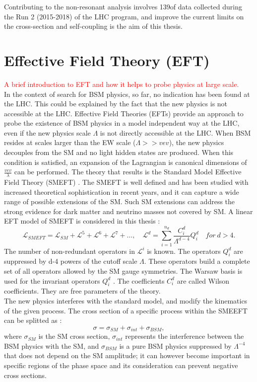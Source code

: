 Contributing to the \HHyybb non-resonant analysis involves 139\ifb of data collected during the Run 2 (2015-2018) of the LHC program, and improve the current limits on the cross-section and self-coupling is the aim of this thesis. 
\section{Effective Field Theory (EFT)}
\label{chap1:EFT}
\textcolor{red}{A brief introduction to EFT and how it helps to probe physics at large scale.\\}
In the context of search for BSM physics, so far, no indication has been found at the LHC. This could be explained by the fact that the new physics is not accessible at the LHC. Effective Field Theories (EFTs) provide an approach to probe the existence of BSM physics in a model independent way at the LHC, even if the new physics scale $\Lambda$ is not directly accessible at the LHC. When BSM resides at scales larger than the EW scale ($\Lambda >> vev$), the new physics decouples from the SM and no light hidden states are produced. When this condition is satisfied, an expansion of the Lagrangian is canonical dimensions of $\frac{vev}{\lambda}$ can be performed. The theory that results is the Standard Model Effective Field Theory (SMEFT) \cite{SMEFT_EFT}. The SMEFT is well defined and has been studied with increased theoretical sophistication in recent years, and it can capture a wide range of possible extensions of the SM. Such SM extensions can address the strong evidence for dark matter and neutrino masses not covered by SM. A linear EFT model of SMEFT is considered in this thesis : 
\begin{equation}
    \mathcal{L}_{S M E F T}=\mathcal{L}_{S M}+\mathcal{L}^{5}+\mathcal{L}^{6}+\mathcal{L}^{7}+\ldots, \quad \mathcal{L}^{d}=\sum_{i=1}^{n_{d}} \frac{C_{i}^{d}}{\Lambda^{d-4}} Q_{i}^{d} \quad for \ d>4.
\end{equation}
The number of non-redundant operators in $\mathcal{L}^i$ is known. The operators $Q_i^d$ are suppressed by d-4 powers of the cutoff scale $\Lambda$. These operators build a complete set of all operators allowed by the SM gauge symmetries. The Warsaw basis is used for the invariant operators $Q_i^d$ \cite{Warsaw}. The coefficients $C_i^d$ are called Wilson coefficients. They are free parameters of the theory. \\
The new physics interferes with the standard model, and modify the kinematics of the given process. The cross section of a specific process within the SMEEFT can be splitted as : 
\begin{equation}
    \sigma = \sigma_{SM} + \sigma_{int} + \sigma_{BSM},
\end{equation}
where $\sigma_{SM}$ is the SM cross section, $\sigma_{int}$ represents the interference between the BSM physics with the SM, and $\sigma_{BSM}$ is a pure BSM physics suppressed by $\Lambda^{-4}$ that does not depend on the SM amplitude; it can however become important in specific regions of the phase space and its consideration can prevent negative cross sections. \\

